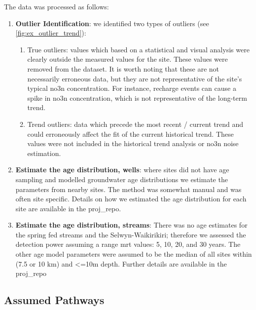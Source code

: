 The data was processed as follows:
\begin{enumerate}
    \item \textbf{Outlier Identification}: we identified two types of outliers (see \autoref{fig:ex_outlier_trend}):
    \begin{enumerate}
        \item  True outliers: values which based on a statistical and visual analysis were clearly outside the measured values for the site. These values were removed from the dataset. It is worth noting that these  are not necessarily erroneous data, but they are not representative of the site's typical \gls{no3n} concentration. For instance, recharge events can cause a spike in \gls{no3n} concentration, which is not representative of the long-term trend.
        \item Trend outliers: data which precede the most recent / current trend and could erroneously affect the fit of the current historical trend. These values were not included in the historical trend analysis or \gls{no3n} noise estimation.
    \end{enumerate}
    \item \textbf{Estimate the age distribution, wells}: where sites did not have age sampling and modelled groundwater age distributions we estimate the parameters from nearby sites. The method was somewhat manual and was often site specific. Details on how we estimated the age distribution for each site are available in the \gls{proj_repo}.
    \item \textbf{Estimate the age distribution, streams}: There was no age estimates for the spring fed streams and the Selwyn-Waikirikiri; therefore we assessed the detection power assuming a range \gls{mrt} values: 5, 10, 20, and 30 years. The other age model parameters were assumed to be the median of all sites within (7.5 or 10 km) and <=10m depth. Further details are available in the \gls{proj_repo}
\end{enumerate}


\begin{landscape}
\end{landscape}


\subsection[Pathways]{Assumed Pathways} \label{subsec:apriori}

